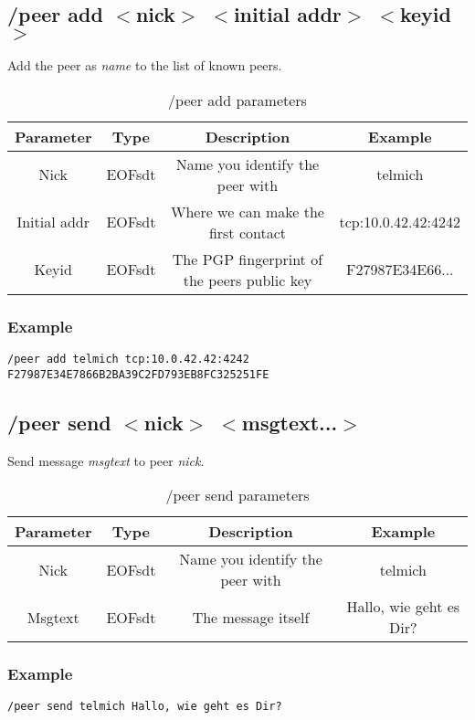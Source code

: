 \documentclass[12pt,a4paper]{book}
\begin{document}
\subsection{/peer add $<$nick$>$ $<$initial addr$>$ $<$keyid$>$}
Add the peer as \textit{name} to the list of known peers.

%
\begin{longtable}{|c|c|c|c|}
\caption{/peer add parameters}\\
\hline
\textbf{Parameter} & \textbf{Type} & \textbf{Description} & \textbf{Example}\\
\hline
Nick & EOFsdt & Name you identify the peer with & telmich\\
\hline
Initial addr & EOFsdt & Where we can make the first contact & tcp:10.0.42.42:4242\\
\hline
Keyid & EOFsdt & The PGP fingerprint of the peers public key & F27987E34E66...\\
\hline
\end{longtable}

\subsubsection{Example}
\begin{verbatim}
/peer add telmich tcp:10.0.42.42:4242 F27987E34E7866B2BA39C2FD793EB8FC325251FE
\end{verbatim}
\subsection{/peer send $<$nick$>$ $<$msgtext...$>$}
Send message \textit{msgtext} to peer \textit{nick}.

%
\begin{longtable}{|c|c|c|c|}
\caption{/peer send parameters}\\
\hline
\textbf{Parameter} & \textbf{Type} & \textbf{Description} & \textbf{Example}\\
\hline
Nick & EOFsdt & Name you identify the peer with & telmich\\
\hline
Msgtext & EOFsdt & The message itself & Hallo, wie geht es Dir?\\
\hline
\end{longtable}

\subsubsection{Example}
\begin{verbatim}
/peer send telmich Hallo, wie geht es Dir?
\end{verbatim}
\end{document}
